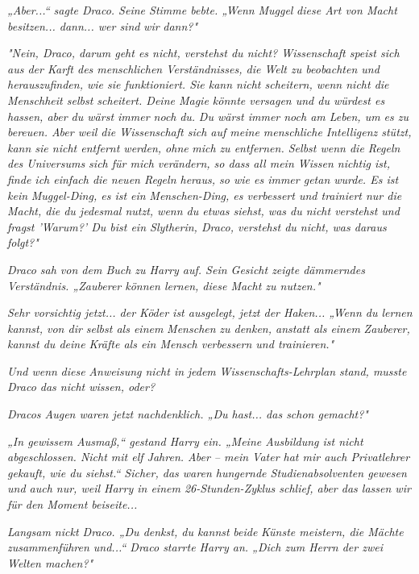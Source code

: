 {\emph{„Aber...“ sagte Draco. Seine Stimme bebte. „Wenn} \emph{\emph{Muggel}} \emph{diese Art von Macht besitzen... dann... wer sind} \emph{\emph{wir}} \emph{dann?"}

\emph{"Nein, Draco, darum geht es nicht, verstehst du nicht? Wissenschaft speist sich aus der Karft des menschlichen Verständnisses, die Welt zu beobachten und herauszufinden, wie sie funktioniert. Sie kann nicht scheitern, wenn nicht die Menschheit selbst scheitert. Deine Magie könnte versagen und du würdest es hassen, aber du wärst immer noch} \emph{\emph{du.}} \emph{Du wärst immer noch am Leben, um es zu bereuen. Aber weil die Wissenschaft sich auf meine menschliche Intelligenz stützt, kann sie nicht entfernt werden, ohne} \emph{\emph{mich}} \emph{zu entfernen. Selbst wenn die Regeln des Universums sich für mich verändern, so dass all mein Wissen nichtig ist, finde ich einfach die neuen Regeln heraus, so wie es immer getan wurde. Es ist kein} \emph{\emph{Muggel}-Ding, es ist ein} \emph{\emph{Menschen}-Ding, es verbessert und trainiert nur die Macht, die du jedesmal nutzt, wenn du etwas siehst, was du nicht verstehst und fragst 'Warum?' Du bist ein Slytherin, Draco, verstehst du nicht, was daraus folgt?"}

\emph{Draco sah von dem Buch zu Harry auf. Sein Gesicht zeigte dämmerndes Verständnis. „Zauberer können lernen, diese Macht zu nutzen."}

\emph{Sehr vorsichtig jetzt... der Köder ist ausgelegt, jetzt der Haken... „Wenn du lernen kannst, von dir selbst als einem} \emph{\emph{Menschen}} \emph{zu denken, anstatt als einem} \emph{\emph{Zauberer,}} \emph{kannst du deine Kräfte als ein Mensch verbessern und trainieren."}

\emph{Und wenn} \emph{\emph{diese}} \emph{Anweisung nicht in} \emph{\emph{jedem}} \emph{Wissenschafts-Lehrplan stand, musste Draco das nicht wissen, oder?}

\emph{Dracos Augen waren jetzt nachdenklich. „Du hast... das schon gemacht?"}

\emph{„In gewissem Ausmaß,“ gestand Harry ein. „Meine Ausbildung ist nicht abgeschlossen. Nicht mit elf Jahren. Aber -- mein Vater hat mir auch Privatlehrer gekauft, wie du siehst.“ Sicher, das waren hungernde Studienabsolventen gewesen und auch nur, weil Harry in einem 26-Stunden-Zyklus schlief, aber das lassen wir für den Moment beiseite...}

\emph{Langsam nickt Draco. „Du denkst, du kannst} \emph{\emph{beide}} \emph{Künste meistern, die Mächte zusammenführen und...“ Draco starrte Harry an. „Dich zum Herrn der zwei Welten machen?"}

}
